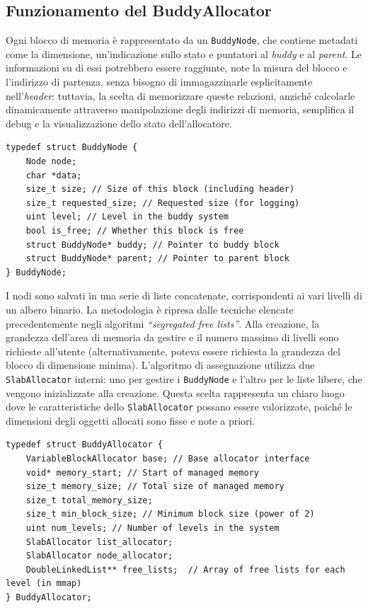\subsection*{Funzionamento del BuddyAllocator}
Ogni blocco di memoria è rappresentato da un \texttt{BuddyNode}, che contiene metadati come la dimensione, un’indicazione sullo stato e puntatori al \textit{buddy} e al \textit{parent}. Le informazioni su di essi potrebbero essere raggiunte, note la misura del blocco e l’indirizzo di partenza, senza bisogno di immagazzinarle esplicitamente nell’\textit{header}: tuttavia, la scelta di memorizzare queste relazioni, anziché calcolarle dinamicamente attraverso manipolazione degli indirizzi di memoria, semplifica il debug e la visualizzazione dello stato dell'allocatore.

\begin{lstlisting}
typedef struct BuddyNode {
    Node node;
    char *data;
    size_t size; // Size of this block (including header)
    size_t requested_size; // Requested size (for logging)
    uint level; // Level in the buddy system
    bool is_free; // Whether this block is free
    struct BuddyNode* buddy; // Pointer to buddy block
    struct BuddyNode* parent; // Pointer to parent block
} BuddyNode;
\end{lstlisting}

I nodi sono salvati in una serie di liste concatenate, corrispondenti ai vari livelli di un albero binario. La metodologia è ripresa dalle tecniche elencate precedentemente negli algoritmi \textit{“segregated free lists”}. Alla creazione, la grandezza dell’area di memoria da gestire e il numero massimo di livelli sono richieste all'utente (alternativamente, poteva essere richiesta la grandezza del blocco di dimensione minima). L'algoritmo di assegnazione utilizza due \texttt{SlabAllocator} interni: uno per gestire i \texttt{BuddyNode} e l'altro per le liste libere, che vengono inizializzate alla creazione. Questa scelta rappresenta un chiaro luogo dove le caratteristiche dello \texttt{SlabAllocator} possano essere valorizzate, poiché le dimensioni degli oggetti allocati sono fisse e note a priori.

\begin{lstlisting}
typedef struct BuddyAllocator {
    VariableBlockAllocator base; // Base allocator interface
    void* memory_start; // Start of managed memory
    size_t memory_size; // Total size of managed memory
    size_t total_memory_size;
    size_t min_block_size; // Minimum block size (power of 2)
    uint num_levels; // Number of levels in the system
    SlabAllocator list_allocator;
    SlabAllocator node_allocator;
    DoubleLinkedList** free_lists;  // Array of free lists for each level (in mmap)
} BuddyAllocator;
\end{lstlisting}

